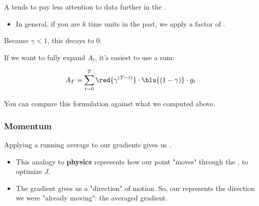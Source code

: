             \begin{concept}
                A  tends to pay less attention to data further in the .

                \begin{itemize}
                    \item In general, if you are $k$ time units in the past, we apply a factor of .
                \end{itemize}

                Because $\gamma<1$, this  decays to 0.

                \subsecdiv

                If we want to fully expand $A_t$, it's easiest to use a sum:

                \begin{equation*}
                    A_T = \sum_{t=0}^T \red{\gamma^{(T-t)}} \cdot \blu{(1-\gamma)} \cdot g_t
                \end{equation*}
            \end{concept}
            You can compare this formulation against what we computed above.

            \subsecdiv
            
        \subsubsection{Momentum}

            Applying a running average to our gradients gives us .

            \begin{itemize}
                \item This analogy to \textbf{physics} represents how our point "moves" through the , to optimize $J$.
                    
                \item The gradient gives us a "direction" of motion. So, our  represents the direction we were "already moving": the  averaged gradient.
            \end{itemize}


